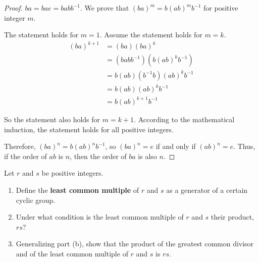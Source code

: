 \begin{proof}
    $ba = bae = babb^{-1}$. We prove that ${(ba)}^{m} = b{(ab)}^{m}b^{-1}$ for positive integer $m$.

    The statement holds for $m = 1$. Assume the statement holds for $m = k$.
    \begin{align*}
        {(ba)}^{k+1} & = (ba){(ba)}^{k}                 \\
                     & = (babb^{-1})(b{(ab)}^{k}b^{-1}) \\
                     & = b(ab)(b^{-1}b){(ab)}^{k}b^{-1} \\
                     & = b(ab){(ab)}^{k}b^{-1}          \\
                     & = b{(ab)}^{k+1}b^{-1}
    \end{align*}

    So the statement also holds for $m = k + 1$. According to the mathematical induction, the statement holds for all positive integers.

    Therefore, ${(ba)}^{n} = b{(ab)}^{n}b^{-1}$, so ${(ba)}^{n} = e$ if and only if ${(ab)}^{n} = e$. Thus, if the order of $ab$ is $n$, then the order of $ba$ is also $n$.
\end{proof}

\begin{exercise}
    Let $r$ and $s$ be positive integers.
    \begin{enumerate}[label={\textbf{\alph*.}}]
        \item Define the \textbf{least common multiple} of $r$ and $s$ as a generator of a certain cyclic group.
        \item Under what condition is the least common multiple of $r$ and $s$ their product, $rs$?
        \item Generalizing part (b), show that the product of the greatest common divisor and of the least common multiple of $r$ and $s$ is $rs$.
    \end{enumerate}
\end{exercise}

